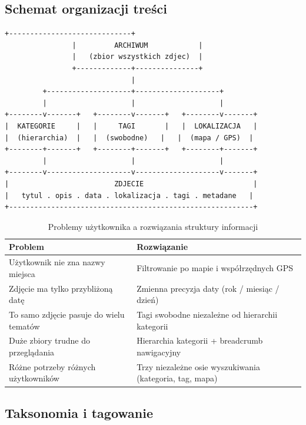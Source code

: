 \documentclass[12pt, a4paper]{article}
\begin{document}
\subsection{Schemat organizacji treści}

\begin{lstlisting}[style=plain, caption={Schemat trzech osi klasyfikacji zdjęć}]
                +-----------------------------+
                |         ARCHIWUM            |
                |   (zbior wszystkich zdjec)  |
                +-------------+---------------+
                              |
         +--------------------+--------------------+
         |                    |                    |
+--------v-------+   +--------v-------+   +--------v-------+
|  KATEGORIE     |   |     TAGI       |   |  LOKALIZACJA   |
|  (hierarchia)  |   |  (swobodne)   |   |  (mapa / GPS)  |
+--------+-------+   +--------+-------+   +--------+-------+
         |                    |                    |
+--------v--------------------v--------------------v-------+
|                         ZDJECIE                          |
|   tytul . opis . data . lokalizacja . tagi . metadane   |
+----------------------------------------------------------+
\end{lstlisting}

\begin{table}[H]
  \centering
  \caption{Problemy użytkownika a rozwiązania struktury informacji}
  \begin{tabular}{@{}L{6cm}L{8cm}@{}}
    \toprule
    \textbf{Problem} & \textbf{Rozwiązanie} \\
    \midrule
    Użytkownik nie zna nazwy miejsca & Filtrowanie po mapie i współrzędnych GPS \\
    \addlinespace
    Zdjęcie ma tylko przybliżoną datę & Zmienna precyzja daty (rok / miesiąc / dzień) \\
    \addlinespace
    To samo zdjęcie pasuje do wielu tematów & Tagi swobodne niezależne od hierarchii kategorii \\
    \addlinespace
    Duże zbiory trudne do przeglądania & Hierarchia kategorii + breadcrumb nawigacyjny \\
    \addlinespace
    Różne potrzeby różnych użytkowników & Trzy niezależne osie wyszukiwania (kategoria, tag, mapa) \\
    \bottomrule
  \end{tabular}
\end{table}

\subsection{Taksonomia i tagowanie}
\end{document}
